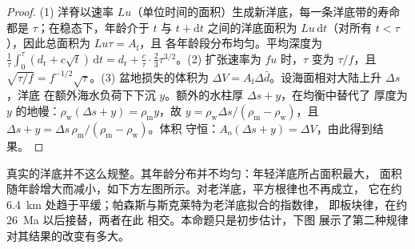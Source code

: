 \begin{proof}
(1) 洋脊以速率 $Lu$（单位时间的面积）生成新洋底，每一条洋底带的寿命都是
$\tau$；在稳态下，年龄介于 $t$ 与 $t + \mathrm{d}t$ 之间的洋底面积为
 $Lu\,\mathrm{d}t$（对所有 $t < \tau$），因此总面积为 $Lu\tau = A_{\text{f}}$，且
各年龄段分布均匀。平均深度为
$\frac1\tau\int_0^\tau (d_{\text{r}} + c\sqrt t)\,\mathrm{d}t = d_{\text{r}} + \frac{c}{\tau}
\cdot\frac23\tau^{3/2}$。(2) 扩张速率为 $fu$ 时，$\tau$ 变为 $\tau/f$，且
$\sqrt{\tau/f} = f^{-1/2}\sqrt\tau$。(3) 盆地损失的体积为 $\Delta V = A_{\text{f}}
\Delta\bar d$。设海面相对大陆上升 $\Delta s$，洋底
在额外海水负荷下下沉 $y$。额外的水柱厚 $\Delta s + y$，在均衡中替代了
厚度为 $y$ 的地幔：$\rho_{\text{w}}(\Delta s + y) =
\rho_{\text{m}} y$，故 $y = \rho_{\text{w}}\Delta s/(\rho_{\text{m}} - \rho_{\text{w}})$，且
$\Delta s + y = \Delta s\,\rho_{\text{m}}/(\rho_{\text{m}} - \rho_{\text{w}})$。体积
守恒：$A_{\text{o}}(\Delta s + y) = \Delta V$，由此得到结果。
\end{proof}

真实的洋底并不这么规整。其年龄分布并不均匀：年轻洋底所占面积最大，
面积随年龄增大而减小，如下方左图所示。对老洋底，平方根律也不再成立，
它在约 \qty{6.4}{km} 处趋于平缓；帕森斯与斯克莱特为老洋底拟合的指数律，
即板块律，在约 \qty{26}{Ma} 以后接替，两者在此
相交。本命题只是初步估计，下图
展示了第二种规律对其结果的改变有多大。


